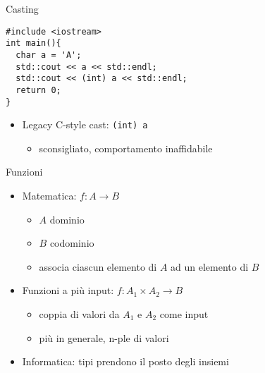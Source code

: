 \begin{frame}[fragile]{Casting}
  \vfill
  \begin{lstlisting}
#include <iostream>
int main(){
  char a = 'A';
  std::cout << a << std::endl;
  std::cout << (int) a << std::endl;
  return 0;
}
  \end{lstlisting}
  \vfill
  \begin{itemize}
    \item Legacy C-style cast: \lstinline$(int) a$
    \begin{itemize}
      \item sconsigliato, comportamento inaffidabile
    \end{itemize}
  \end{itemize}
  \vfill
\end{frame}

\begin{frame}[fragile]{Funzioni}
  \vfill
  \begin{itemize}
    \item Matematica: \(f : A \to B\)
    \begin{itemize}
      \item \(A\) dominio
      \item \(B\) codominio
      \item associa ciascun elemento di \(A\) ad un elemento di \(B\)
    \end{itemize}
    \vfill
    \item Funzioni a più input: \(f : A_1 \times A_2 \to B\)
    \begin{itemize}
      \item coppia di valori da \(A_1\) e \(A_2\) come input
      \item più in generale, n-ple di valori
    \end{itemize}
    \vfill
    \item Informatica: \alert{tipi} prendono il posto degli insiemi
  \end{itemize}
  \vfill
\end{frame}

